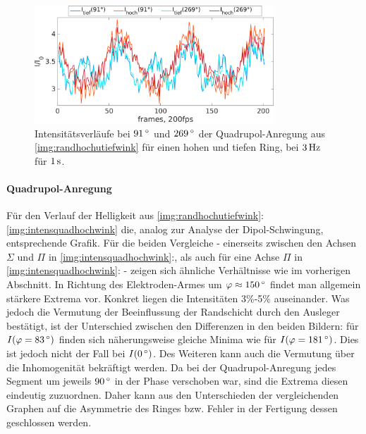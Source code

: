           \begin{figure}[!b]
            \centering
            \includegraphics[width=0.8\textwidth,height=0.45\textwidth]{figs/auswertung/plasmaglw/intens270u90hochutiefquad3Hz1sek.png}
            \caption{Intensitätsverläufe bei $\unit[91]{\degree}$ und $\unit[269]{\degree}$ der Quadrupol-Anregung aus \autoref{img:randhochutiefwink} für einen hohen und tiefen Ring, bei $\unit[3]{Hz}$ für $\unit[1]{s}$. }
            \label{img:intensquadhochutief}
          \end{figure}

      \paragraph{Quadrupol-Anregung}

        Für den Verlauf der Helligkeit aus \autoref{img:randhochutiefwink}:\underline{} \autoref{img:intensquadhochwink} die, analog zur Analyse der Dipol-Schwingung, entsprechende Grafik. Für die beiden Vergleiche - einerseits zwischen den Achsen $\Sigma$ und $\Pi$ in \autoref{img:intensquadhochwink}:\underline{}, als auch für eine Achse $\Pi$ in \autoref{img:intensquadhochwink}:\underline{} - zeigen sich ähnliche Verhältnisse wie im vorherigen Abschnitt. In Richtung des Elektroden-Armes um $\varphi\approx\unit[150]{\degree}$ findet man allgemein stärkere Extrema vor. Konkret liegen die Intensitäten 3\%-5\% auseinander. Was jedoch die Vermutung der Beeinflussung der Randschicht durch den Ausleger bestätigt, ist der Unterschied zwischen den Differenzen in den beiden Bildern: für $I(\varphi=\unit[83]{\degree})$ finden sich näherungsweise gleiche Minima wie für $I(\varphi=\unit[181]{\degree})$. Dies ist jedoch nicht der Fall bei $I(\unit[0]{\degree})$. Des Weiteren kann auch die Vermutung über die Inhomogenität bekräftigt werden. Da bei der Quadrupol-Anregung jedes Segment um jeweils $\unit[90]{\degree}$ in der Phase verschoben war, sind die Extrema diesen eindeutig zuzuordnen. Daher kann aus den Unterschieden der vergleichenden Graphen auf die Asymmetrie des Ringes bzw. Fehler in der Fertigung dessen geschlossen werden.

